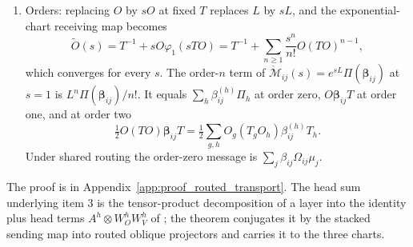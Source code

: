 \documentclass[twoside,11pt]{article}
\begin{document}
\begin{theorem}
\begin{enumerate}
\begin{equation}
m_i=\sum_j\beta_{ij}\Theta_{ij}\mu_j
\label{eq:routed_hopping}
\end{equation}
in the exponential chart, $m_i=\sum_j\beta_{ij}U_iLU_j^{-1}\mu_j$ in the affine chart, and $m_i=\sum_j\beta_{ij}(\Omega_{ij}+U_iLU_j^{-1})\mu_j$ in the first-order chart.
\item Orders: replacing $O$ by $sO$ at fixed $T$ replaces $L$ by $sL$, and the exponential-chart receiving map becomes
\begin{equation}
\widetilde O(s)=T^{-1}+sO\varphi_1(sTO)=T^{-1}+\sum_{n\ge1}\frac{s^n}{n!}O(TO)^{n-1},
\label{eq:lie_orders}
\end{equation}
which converges for every $s$. The order-$n$ term of $\mathring{\mathcal M}_{ij}(s)=e^{sL}\Pi(\boldsymbol\beta_{ij})$ at $s=1$ is $L^n\Pi(\boldsymbol\beta_{ij})/n!$. It equals $\sum_h\beta_{ij}^{(h)}\Pi_h$ at order zero, $O\boldsymbol\beta_{ij}T$ at order one, and at order two
\begin{equation}
\tfrac12O(TO)\boldsymbol\beta_{ij}T=\tfrac12\sum_{g,h}O_g(T_gO_h)\beta_{ij}^{(h)}T_h.
\label{eq:lie_order_two}
\end{equation}
Under shared routing the order-zero message is $\sum_j\beta_{ij}\Omega_{ij}\mu_j$.
\end{enumerate}
\end{theorem}
The proof is in Appendix~\ref{app:proof_routed_transport}. The head sum underlying item 3 is the tensor-product decomposition of a layer into the identity plus head terms $A^h\otimes W_O^hW_V^h$ of \citet{elhage2021mathematical}; the theorem conjugates it by the stacked sending map into routed oblique projectors and carries it to the three charts.
\end{document}
